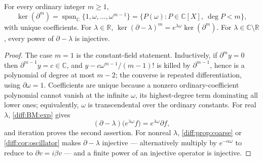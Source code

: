 \documentclass[11pt,letterpaper]{article}
\numberwithin{equation}{section}
\theoremstyle{definition}
\theoremstyle{remark}
\newcommand{\R}{\mathbb R}
\newcommand{\C}{\mathbb C}
\newcommand{\der}{\partial}
\newcommand{\Span}{\operatorname{span}}
\newcommand{\Ker}{\operatorname{ker}}
\begin{document}
\begin{lemma}
\label{diff:lem:kernels}
For every ordinary integer $m\geq1$,
\[
 \Ker(\der^{m})=\Span_{\C}\{1,\omega,\dots,\omega^{m-1}\}
 =\{P(\omega):P\in\C[X],\ \deg P<m\},
\]
with unique coefficients. For $\lambda\in\R$,
$\Ker(\der-\lambda)^{m}=e^{\lambda\omega}\Ker(\der^{m})$. For
$\lambda\in\C\setminus\R$, every power of $\der-\lambda$ is injective.
\end{lemma}
\begin{proof}
The case $m=1$ is the constant-field statement. Inductively, if
$\der^{m}y=0$ then $\der^{m-1}y=c\in\C$, and
$y-c\omega^{m-1}/(m-1)!$ is killed by $\der^{m-1}$, hence is a polynomial of
degree at most $m-2$; the converse is repeated differentiation, using
$\der\omega=1$. Coefficients are unique because a nonzero
ordinary-coefficient polynomial cannot vanish at the infinite $\omega$, its
highest-degree term dominating all lower ones; equivalently, $\omega$ is
transcendental over the ordinary constants. For real $\lambda$,
\ref{diff:BM:exp} gives
\begin{equation}\label{diff:eq:conjugate}
 (\der-\lambda)\bigl(e^{\lambda\omega}f\bigr)=e^{\lambda\omega}\der f,
\end{equation}
and iteration proves the second assertion. For nonreal $\lambda$,
\cref{diff:prop:coarse} or \cref{diff:cor:oscillator} makes $\der-\lambda$
injective --- alternatively multiply by $e^{-\alpha\omega}$ to reduce to
$\der v=i\beta v$ --- and a finite power of an injective operator is
injective.
\end{proof}
\end{document}
